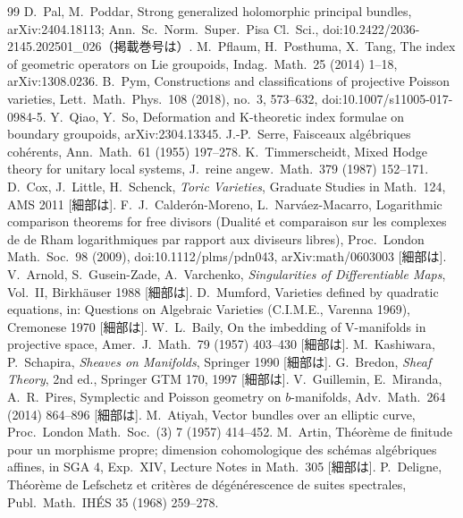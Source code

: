 \begin{thebibliography}{99}
 D.\ Pal, M.\ Poddar, Strong generalized holomorphic principal bundles, arXiv:2404.18113; Ann.\ Sc.\ Norm.\ Super.\ Pisa Cl.\ Sci., doi:10.2422/2036-2145.202501\_026（掲載巻号は\tQ）.
 M.\ Pflaum, H.\ Posthuma, X.\ Tang, The index of geometric operators on Lie groupoids, Indag.\ Math.\ 25 (2014) 1--18, arXiv:1308.0236.
 B.\ Pym, Constructions and classifications of projective Poisson varieties, Lett.\ Math.\ Phys.\ 108 (2018), no.\ 3, 573--632, doi:10.1007/s11005-017-0984-5.
 Y.\ Qiao, Y.\ So, Deformation and K-theoretic index formulae on boundary groupoids, arXiv:2304.13345.
 J.-P.\ Serre, Faisceaux alg\'ebriques coh\'erents, Ann.\ Math.\ 61 (1955) 197--278.
 K.\ Timmerscheidt, Mixed Hodge theory for unitary local systems, J.\ reine angew.\ Math.\ 379 (1987) 152--171.
 D.\ Cox, J.\ Little, H.\ Schenck, \emph{Toric Varieties}, Graduate Studies in Math.\ 124, AMS 2011 [細部は\tQ].
 F.\ J.\ Calder\'on-Moreno, L.\ Narv\'aez-Macarro, Logarithmic comparison theorems for free divisors (Dualit\'e et comparaison sur les complexes de de Rham logarithmiques par rapport aux diviseurs libres), Proc.\ London Math.\ Soc.\ 98 (2009), doi:10.1112/plms/pdn043, arXiv:math/0603003 [細部は\tQ].
 V.\ Arnold, S.\ Gusein-Zade, A.\ Varchenko, \emph{Singularities of Differentiable Maps}, Vol.\ II, Birkh\"auser 1988 [細部は\tQ].
 D.\ Mumford, Varieties defined by quadratic equations, in: Questions on Algebraic Varieties (C.I.M.E., Varenna 1969), Cremonese 1970 [細部は\tQ].
 W.\ L.\ Baily, On the imbedding of V-manifolds in projective space, Amer.\ J.\ Math.\ 79 (1957) 403--430 [細部は\tQ].
 M.\ Kashiwara, P.\ Schapira, \emph{Sheaves on Manifolds}, Springer 1990 [細部は\tQ].
 G.\ Bredon, \emph{Sheaf Theory}, 2nd ed., Springer GTM 170, 1997 [細部は\tQ].
 V.\ Guillemin, E.\ Miranda, A.\ R.\ Pires, Symplectic and Poisson geometry on $b$-manifolds, Adv.\ Math.\ 264 (2014) 864--896 [細部は\tQ].
 M.\ Atiyah, Vector bundles over an elliptic curve, Proc.\ London Math.\ Soc.\ (3) 7 (1957) 414--452.
 M.\ Artin, Th\'eor\`eme de finitude pour un morphisme propre; dimension cohomologique des sch\'emas alg\'ebriques affines, in SGA 4, Exp.\ XIV, Lecture Notes in Math.\ 305 [細部は\tQ].
 P.\ Deligne, Th\'eor\`eme de Lefschetz et crit\`eres de d\'eg\'en\'erescence de suites spectrales, Publ.\ Math.\ IH\'ES 35 (1968) 259--278.
\end{thebibliography}
